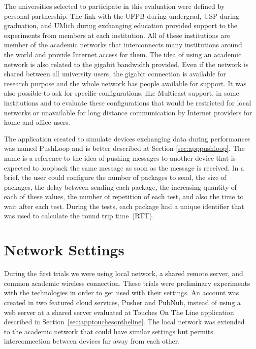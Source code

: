The universities selected to participate in this evaluation were defined by personal partnership.
The link with the UFPB during undergrad, USP during graduation, and UMich during exchanging education provided support to the experiments from members at each institution.
All of these institutions are member of the academic networks that interconnects many institutions around the world and provide Internet access for them.
The idea of using an academic network is also related to the gigabit bandwidth provided.
Even if the network is shared between all university users, the gigabit connection is available for research purpose and the whole network has people available for support.
It was also possible to ask for specific configurations, like Multicast support, in some institutions and to evaluate these configurations that would be restricted for local networks or unavailable for long distance communication by Internet providers for home and office users.

The application created to simulate devices exchanging data during performances was named PushLoop and is better described at Section \ref{sec:apppushloop}.
The name is a reference to the idea of pushing messages to another device that is expected to loopback the same message as soon as the message is received.
In a brief, the user could configure the number of packages to send, the size of packages, the delay between sending each package, the increasing quantity of each of these values, the number of repetition of each test, and also the time to wait after each test.
During the tests, each package had a unique identifier that was used to calculate the round trip time~(RTT).

\section{Network Settings}
\label{sec:networksettings}


During the first trials we were using local network, a shared remote server, and common academic wireless connection.
These trials were preliminary experiments with the technologies in order to get used with their settings.
An account was created in two featured cloud services, Pusher and PubNub, instead of using a web server at a shared server evaluated at Touches On The Line application described in Section~\ref{sec:apptouchesontheline}.
The local network was extended to the academic network that could have similar settings but permits interconnection between devices far away from each other.

